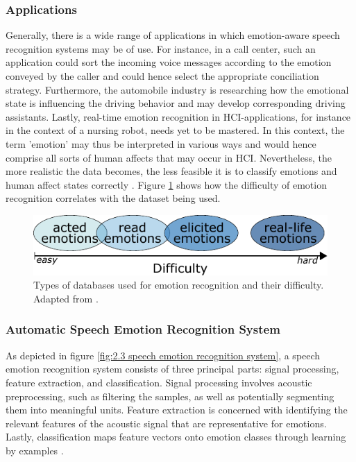 \documentclass[11pt,a4paper,twoside]{article}
\theoremstyle{thmbreak}
\numberwithin{Theorem}{subsection}
\theoremstyle{defbreak}
\theoremstyle{remark}
\theoremstyle{remark}
\begin{document}
\subsubsection{Applications}
Generally, there is a wide range of  applications in which emotion-aware speech recognition systems may be of use. 
For instance, in a call center, such an application could sort the incoming voice messages according to the emotion conveyed by the caller and could hence select the appropriate conciliation strategy.
Furthermore, the automobile industry is researching how the emotional state is influencing the driving behavior \cite{vogt2008automatic} and may develop corresponding driving assistants. 
Lastly, real-time emotion recognition in HCI-applications, for instance in the context of a nursing robot, needs yet to be mastered. 
In this context, the term 'emotion' may thus be interpreted in various ways and would hence comprise all sorts of human affects that may occur in HCI. 
Nevertheless, the more realistic the data becomes, the less feasible it is to classify emotions and human affect states correctly \cite{vogt2008automatic}. 
Figure \ref{fig:2.2 different Databases} shows how the difficulty of emotion recognition correlates with the dataset being used.
\begin{figure}[ht!]
	\centering
	\includegraphics[scale=1.0]{differentDatabases.pdf}
	\caption{Types of databases used for emotion recognition and their difficulty. Adapted from \cite{vogt2008automatic}.}
	\label{fig:2.2 different Databases}
\end{figure}
\subsubsection{Automatic Speech Emotion Recognition System}
 As depicted in figure \ref{fig:2.3 speech emotion recognition system}, 
  a speech emotion recognition system consists of three principal parts: signal processing, feature extraction, and classification.
  Signal processing involves acoustic preprocessing, such as filtering the samples, as well as potentially segmenting them into meaningful units.
  Feature extraction is concerned with  identifying the relevant features of the acoustic signal  that are representative for emotions.
   Lastly, classification maps feature vectors onto emotion classes  through learning by examples \cite{vogt2008automatic}.
 
\end{document}
